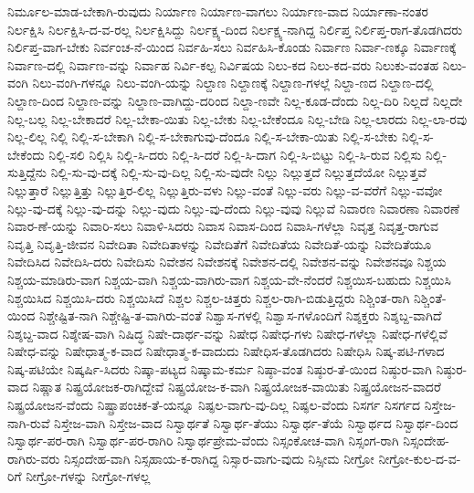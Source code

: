{ನಿರ್ಮೂಲ-ಮಾಡ-ಬೇಕಾಗಿ-ರುವುದು
ನಿರ್ಯಾಣ
ನಿರ್ಯಾಣ-ವಾಗಲು
ನಿರ್ಯಾಣ-ವಾದ
ನಿರ್ಯಾಣಾ-ನಂತರ
ನಿರ್ಲಕ್ಷಿಸಿ
ನಿರ್ಲಕ್ಷಿಸಿ-ದ-ವ-ರಲ್ಲ
ನಿರ್ಲಕ್ಷಿಸಿದ್ದು
ನಿರ್ಲಕ್ಷ್ಯ-ದಿಂದ
ನಿರ್ಲಕ್ಷ್ಯ-ನಾಗಿದ್ದ
ನಿರ್ಲಿಪ್ತ
ನಿರ್ಲಿಪ್ತ-ರಾಗ-ತೊಡಗಿದರು
ನಿರ್ಲಿಪ್ತ-ವಾಗ-ಬೇಕು
ನಿರ್ವಂಚ-ನೆ-ಯಿಂದ
ನಿರ್ವಹಿ-ಸಲು
ನಿರ್ವಹಿಸಿ-ಕೊಂಡು
ನಿರ್ವಾಣ
ನಿರ್ವಾ-ಣಕ್ಕೂ
ನಿರ್ವಾಣಕ್ಕೆ
ನಿರ್ವಾಣ-ದಲ್ಲಿ
ನಿರ್ವಾಣ-ವನ್ನು
ನಿರ್ವಾಹ
ನಿರ್ವಿ-ಕಲ್ಪ
ನಿರ್ವಿಷಯ
ನಿಲು-ಕದ
ನಿಲು-ಕದ-ವರು
ನಿಲುಕು-ವಂತಹ
ನಿಲು-ವಂಗಿ
ನಿಲು-ವಂಗಿ-ಗಳನ್ನೂ
ನಿಲು-ವಂಗಿ-ಯನ್ನು
ನಿಲ್ದಾಣ
ನಿಲ್ದಾಣಕ್ಕೆ
ನಿಲ್ದಾಣ-ಗಳಲ್ಲೆ
ನಿಲ್ದಾ-ಣದ
ನಿಲ್ದಾಣ-ದಲ್ಲಿ
ನಿಲ್ದಾಣ-ದಿಂದ
ನಿಲ್ದಾಣ-ವನ್ನು
ನಿಲ್ದಾಣ-ವಾಗಿದ್ದು-ದರಿಂದ
ನಿಲ್ದಾ-ಣವೇ
ನಿಲ್ಲ-ಕೂಡ-ದೆಂದು
ನಿಲ್ಲ-ದಿರಿ
ನಿಲ್ಲದೆ
ನಿಲ್ಲದೇ
ನಿಲ್ಲ-ಬಲ್ಲ
ನಿಲ್ಲ-ಬೇಕಾದರೆ
ನಿಲ್ಲ-ಬೇಕಾ-ಯಿತು
ನಿಲ್ಲ-ಬೇಕು
ನಿಲ್ಲ-ಬೇಕೆಂದೂ
ನಿಲ್ಲ-ಬೇಡಿ
ನಿಲ್ಲ-ಲಾರದು
ನಿಲ್ಲ-ಲಾ-ರವು
ನಿಲ್ಲ-ಲಿಲ್ಲ
ನಿಲ್ಲಿ
ನಿಲ್ಲಿ-ಸ-ಬೇಕಾಗಿ
ನಿಲ್ಲಿ-ಸ-ಬೇಕಾಗುವು-ದೆಂದೂ
ನಿಲ್ಲಿ-ಸ-ಬೇಕಾ-ಯಿತು
ನಿಲ್ಲಿ-ಸ-ಬೇಕು
ನಿಲ್ಲಿ-ಸ-ಬೇಕೆಂದು
ನಿಲ್ಲಿ-ಸಲಿ
ನಿಲ್ಲಿಸಿ
ನಿಲ್ಲಿ-ಸಿ-ದರು
ನಿಲ್ಲಿ-ಸಿ-ದರೆ
ನಿಲ್ಲಿ-ಸಿ-ದಾಗ
ನಿಲ್ಲಿ-ಸಿ-ಬಿಟ್ಟು
ನಿಲ್ಲಿ-ಸಿ-ರುವ
ನಿಲ್ಲಿಸು
ನಿಲ್ಲಿ-ಸುತ್ತಿದ್ದೆನು
ನಿಲ್ಲಿ-ಸು-ವು-ದಕ್ಕೆ
ನಿಲ್ಲಿ-ಸು-ವು-ದಿಲ್ಲ
ನಿಲ್ಲಿ-ಸು-ವುದೇ
ನಿಲ್ಲು
ನಿಲ್ಲುತ್ತದೆ
ನಿಲ್ಲುತ್ತದೆಯೋ
ನಿಲ್ಲುತ್ತವೆ
ನಿಲ್ಲುತ್ತಾರೆ
ನಿಲ್ಲುತ್ತಿತ್ತು
ನಿಲ್ಲುತ್ತಿರ-ಲಿಲ್ಲ
ನಿಲ್ಲುತ್ತಿರು-ವಳು
ನಿಲ್ಲು-ವಂತೆ
ನಿಲ್ಲು-ವರು
ನಿಲ್ಲು-ವ-ವರೆಗೆ
ನಿಲ್ಲು-ವವೋ
ನಿಲ್ಲು-ವು-ದಕ್ಕೆ
ನಿಲ್ಲು-ವು-ದನ್ನು
ನಿಲ್ಲು-ವುದು
ನಿಲ್ಲು-ವು-ದೆಂದು
ನಿಲ್ಲು-ವುವು
ನಿಲ್ಲುವೆ
ನಿವಾರಣ
ನಿವಾರಣಾ
ನಿವಾರಣೆ
ನಿವಾರ-ಣೆ-ಯನ್ನು
ನಿವಾರಿ-ಸಲು
ನಿವಾಳಿ-ಸಿದರು
ನಿವಾಸ
ನಿವಾಸ-ದಿಂದ
ನಿವಾಸಿ-ಗಳೆಲ್ಲಾ
ನಿವೃತ್ತ
ನಿವೃತ್ತ-ರಾಗುವ
ನಿವೃತ್ತಿ
ನಿವೃತ್ತಿ-ಜೀವನ
ನಿವೇದಿತಾ
ನಿವೇದಿತಾಳನ್ನು
ನಿವೇದಿತೆಗೆ
ನಿವೇದಿತೆಯ
ನಿವೇದಿತೆ-ಯನ್ನು
ನಿವೇದಿತೆಯೂ
ನಿವೇದಿಸಿದ
ನಿವೇದಿಸಿ-ದರು
ನಿವೇದಿಸು
ನಿವೇಶನ
ನಿವೇಶನಕ್ಕೆ
ನಿವೇಶನ-ದಲ್ಲಿ
ನಿವೇಶನ-ವನ್ನು
ನಿವೇಶನವೂ
ನಿಶ್ಚಯ
ನಿಶ್ಚಯ-ಮಾಡಿರು-ವಾಗ
ನಿಶ್ಚಯ-ವಾಗಿ
ನಿಶ್ಚಯ-ವಾಗಿರು-ವಾಗ
ನಿಶ್ಚಯ-ವೇ-ನೆಂದರೆ
ನಿಶ್ಚಯಿಸ-ಬಹುದು
ನಿಶ್ಚಯಿಸಿ
ನಿಶ್ಚಯಿಸಿದ
ನಿಶ್ಚಯಿಸಿ-ದರು
ನಿಶ್ಚಯಿಸಿದೆ
ನಿಶ್ಚಲ
ನಿಶ್ಚಲ-ಚಿತ್ತರು
ನಿಶ್ಚಲ-ರಾಗಿ-ಬಿಡುತ್ತಿದ್ದರು
ನಿಶ್ಚಿಂತ-ರಾಗಿ
ನಿಶ್ಚಿಂತೆ-ಯಿಂದ
ನಿಶ್ಚೇಷ್ಟಿತ-ನಾಗಿ
ನಿಶ್ಚೇಷ್ಟಿ-ತ-ವಾಗಿರು-ವಂತೆ
ನಿಶ್ವಾಸ-ಗಳಲ್ಲಿ
ನಿಶ್ವಾಸ-ಗಳೊಂದಿಗೆ
ನಿಶ್ಶಕ್ತರು
ನಿಶ್ಶಬ್ದ-ವಾಗಿದೆ
ನಿಶ್ಶಬ್ದ-ವಾದ
ನಿಶ್ಶೇಷ-ವಾಗಿ
ನಿಷಿದ್ಧ
ನಿಷೇ-ದಾರ್ಥ-ವನ್ನು
ನಿಷೇಧ
ನಿಷೇಧ-ಗಳು
ನಿಷೇಧ-ಗಳೆಲ್ಲಾ
ನಿಷೇಧ-ಗಳೆಲ್ಲಿವೆ
ನಿಷೇಧ-ವನ್ನು
ನಿಷೇಧಾತ್ಮ-ಕ-ವಾದ
ನಿಷೇಧಾತ್ಮ-ಕ-ವಾದುದು
ನಿಷೇಧಿಸ-ತೊಡಗಿದರು
ನಿಷೇಧಿಸಿ
ನಿಷ್ಕ-ಪಟಿ-ಗಳಾದ
ನಿಷ್ಕ-ಪಟಿಯೇ
ನಿಷ್ಕರ್ಷಿ-ಸಿದರು
ನಿಷ್ಕಾ-ಪಟ್ಯದ
ನಿಷ್ಕಾಮ-ಕರ್ಮ
ನಿಷ್ಠಾ-ವಂತ
ನಿಷ್ಠುರ-ತೆ-ಯಿಂದ
ನಿಷ್ಠುರ-ವಾಗಿ
ನಿಷ್ಠುರ-ವಾದ
ನಿಷ್ಣಾತ
ನಿಷ್ಪ್ರಯೋಜಕ-ರಾಗಿದ್ದೇವೆ
ನಿಷ್ಪ್ರಯೋಜ-ಕ-ವಾಗಿ
ನಿಷ್ಪ್ರಯೋಜಕ-ವಾಯಿತು
ನಿಷ್ಪ್ರಯೋಜನ-ವಾದರೆ
ನಿಷ್ಪ್ರಯೋಜನ-ವೆಂದು
ನಿಷ್ಪ್ರಾಪಂಚಿಕ-ತೆ-ಯನ್ನೂ
ನಿಷ್ಫಲ-ವಾಗು-ವು-ದಿಲ್ಲ
ನಿಷ್ಫಲ-ವೆಂದು
ನಿಸರ್ಗ
ನಿಸರ್ಗದ
ನಿಸ್ತೇಜ-ನಾಗಿ-ರುವೆ
ನಿಸ್ತೇಜ-ವಾಗಿ
ನಿಸ್ತೇಜ-ವಾದ
ನಿಸ್ವಾರ್ಥತೆ
ನಿಸ್ವಾರ್ಥ-ತೆಯು
ನಿಸ್ವಾರ್ಥ-ತೆಯೆ
ನಿಸ್ವಾರ್ಥದ
ನಿಸ್ವಾರ್ಥ-ದಿಂದ
ನಿಸ್ವಾರ್ಥ-ಪರ-ರಾಗಿ
ನಿಸ್ವಾರ್ಥ-ಪರ-ರಾಗಿರಿ
ನಿಸ್ವಾರ್ಥಪ್ರೇಮ-ವೆಂದು
ನಿಸ್ಸಂಕೋಚ-ವಾಗಿ
ನಿಸ್ಸಂಗ-ರಾಗಿ
ನಿಸ್ಸಂದೇಹ-ರಾಗಿರು-ವರು
ನಿಸ್ಸಂದೇಹ-ವಾಗಿ
ನಿಸ್ಸಹಾಯ-ಕ-ರಾಗಿದ್ದ
ನಿಸ್ಸಾರ-ವಾಗು-ವುದು
ನಿಸ್ಸೀಮ
ನೀಗ್ರೋ
ನೀಗ್ರೋ-ಕುಲ-ದ-ವ-ರಿಗೆ
ನೀಗ್ರೋ-ಗಳನ್ನು
ನೀಗ್ರೋ-ಗಳಲ್ಲ
}
